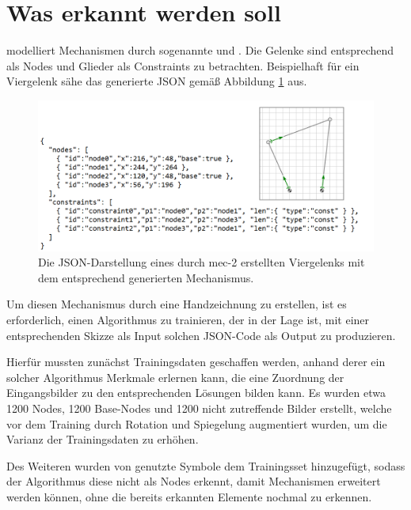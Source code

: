 \section{Was erkannt werden soll}
 modelliert Mechanismen durch
sogenannte  und .
Die Gelenke sind entsprechend als Nodes und Glieder als Constraints zu betrachten.
Beispielhaft für ein Viergelenk sähe das generierte JSON gemä{\ss} Abbildung \ref{fig:4bar} aus.

\begin{figure}
  \includegraphics[width=\textwidth]{images/4bar_json}
  \caption{Die JSON-Darstellung eines durch mec-2 erstellten Viergelenks mit dem entsprechend generierten Mechanismus.}
  \label{fig:4bar}
\end{figure}

Um diesen Mechanismus durch eine Handzeichnung zu erstellen, ist es erforderlich, einen Algorithmus zu trainieren, der in der Lage ist, mit einer entsprechenden Skizze als Input solchen JSON-Code als Output zu produzieren.

Hierfür mussten zunächst Trainingsdaten geschaffen werden, anhand derer ein solcher Algorithmus Merkmale erlernen kann, die eine Zuordnung der Eingangsbilder zu den entsprechenden Lösungen bilden kann.
Es wurden etwa 1200 Nodes, 1200 Base-Nodes und 1200 nicht zutreffende Bilder erstellt, welche vor dem Training durch Rotation und Spiegelung augmentiert wurden, um die Varianz der Trainingsdaten zu erhöhen.

Des Weiteren wurden von  genutzte Symbole dem Trainingsset hinzugefügt, sodass der Algorithmus diese nicht als Nodes erkennt, damit Mechanismen erweitert werden können, ohne die bereits erkannten Elemente nochmal zu erkennen.


